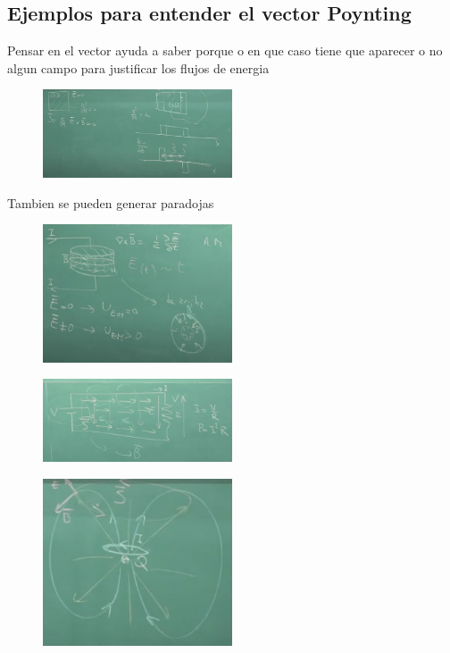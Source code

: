 \documentclass{article}
\begin{document}
		\subsection{Ejemplos para entender el vector Poynting}
		Pensar en el vector ayuda a saber porque o en que caso tiene que aparecer o no algun campo para justificar los flujos de energia
		\begin{figure}[h]
			\centering 
			\includegraphics[width=0.5\textwidth]{imagen2.jpg}
			\label{fig:mi_imagen3} 
		\end{figure}
		Tambien se pueden generar paradojas
		\begin{figure}[h]
			\centering 
			\includegraphics[width=0.5\textwidth]{imagen3.jpg}
			\label{fig:mi_imagen4} 
		\end{figure}
		\begin{figure}[h]
			\centering 
			\includegraphics[width=0.5\textwidth]{imagen4.jpg}
			\label{fig:mi_imagen5} 
		\end{figure}
		\begin{figure}[h]
			\centering 
			\includegraphics[width=0.5\textwidth]{imagen5.jpg}
			\label{fig:mi_imagen6} 
		\end{figure}
		
\end{document}
